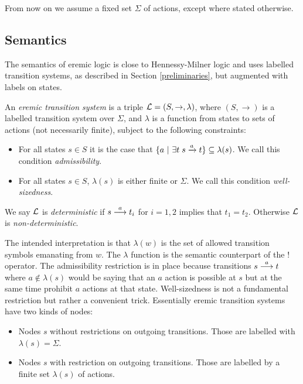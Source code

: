 \begin{convention}
From now on we assume a fixed set $\Sigma$ of actions, except where
stated otherwise.
\end{convention}

\subsection{Semantics}

\NI The semantics of eremic logic is close to Hennessy-Milner logic
\cite{HennessyM:alglawfndac} and uses labelled transition systems, as
described in Section \ref{preliminaries}, but augmented with labels on
states.

\begin{definition}
An \emph{eremic transition system} is a triple $\mathcal{L} = (S, \rightarrow,
\lambda)$, where $(S, \rightarrow)$ is a labelled transition system
over $\Sigma$, and $\lambda$ is a function from states to sets of
actions (not necessarily finite), subject to the following constraints:
\begin{itemize}

\item For all states $s \in S$ it is the case that $ \{a \ | \  \exists
  t \; s \xrightarrow{a} t\} \subseteq \lambda(s)$. We call this
  condition \emph{admissibility}.

\item For all states $s \in S$, $\lambda (s)$ is either finite or
  $\Sigma$. We call this condition \emph{well-sizedness}.

\end{itemize}

\NI We say $\mathcal{L}$ is \emph{deterministic} if $s \stackrel{a}{\longrightarrow} t_i$ for $i
= 1, 2$ implies that $t_1 = t_2$. Otherwise $\mathcal{L}$ is
\emph{non-deterministic}.
\end{definition}

\NI The intended interpretation is that $\lambda(w)$ is the set of
allowed transition symbols emanating from $w$.  The $\lambda$ function
is the semantic counterpart of the $!$ operator.  The admissibility
restriction is in place because transitions $s \stackrel{a}{\longrightarrow} t$ where $a
\notin \lambda(s)$ would be saying that an $a$ action is possible at
$s$ but at the same time prohibit $a$ actions at that state.
Well-sizedness is not a fundamental restriction but rather a
convenient trick. Essentially eremic transition systems have two kinds
of nodes:

\begin{itemize}

\item Nodes $s$ without restrictions on outgoing transitions. Those are
  labelled with $\lambda ( s) = \Sigma$.

\item Nodes $s$ with restriction on outgoing transitions. Those are
  labelled by a finite set $\lambda ( s)$ of actions.

\end{itemize}

